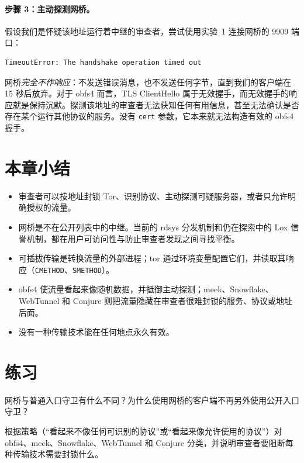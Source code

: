\paragraph{步骤 3：主动探测网桥。}假设我们是怀疑该地址运行着中继的审查者，尝试使用实验~1 连接网桥的 9909 端口：
\begin{lstlisting}[numbers=none]
TimeoutError: The handshake operation timed out
\end{lstlisting}
网桥\emph{完全不作响应}：不发送错误消息，也不发送任何字节，直到我们的客户端在 15 秒后放弃。对于 obfs4 而言，TLS ClientHello 属于无效握手，而无效握手的响应就是保持沉默。探测该地址的审查者无法获知任何有用信息，甚至无法确认是否存在某个运行其他协议的服务。没有 \texttt{cert} 参数，它本来就无法构造有效的 obfs4 握手。

\section*{本章小结}
\begin{itemize}
  \item 审查者可以按地址封锁 Tor、识别协议、主动探测可疑服务器，或者只允许明确授权的流量。
  \item 网桥是不在公开列表中的中继。当前的 rdsys 分发机制和仍在探索中的 Lox 信誉机制，都在用户可访问性与防止审查者发现之间寻找平衡。
  \item 可插拔传输是转换流量的外部进程；tor 通过环境变量配置它们，并读取其响应（\texttt{CMETHOD}、\texttt{SMETHOD}）。
  \item obfs4 使流量看起来像随机数据，并抵御主动探测；meek、Snowflake、WebTunnel 和 Conjure 则把流量隐藏在审查者很难封锁的服务、协议或地址后面。
  \item 没有一种传输技术能在任何地点永久有效。
\end{itemize}

\section*{练习}

\begin{esercizio}[1]\label{es:16-guard}
网桥与普通入口守卫有什么不同？为什么使用网桥的客户端不再另外使用公开入口守卫？
\end{esercizio}

\begin{esercizio}[1]\label{es:16-strategie}
根据策略（\enquote{看起来不像任何可识别的协议}或\enquote{看起来像允许使用的协议}）对 obfs4、meek、Snowflake、WebTunnel 和 Conjure 分类，并说明审查者要阻断每种传输技术需要封锁什么。
\end{esercizio}

